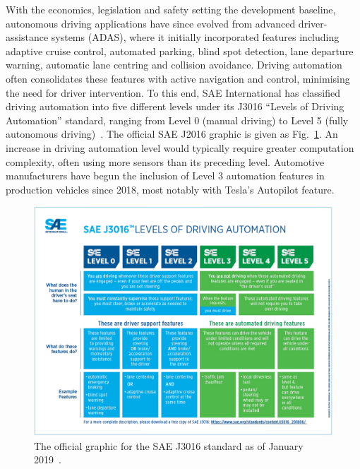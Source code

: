 With the economics, legislation and safety setting the development baseline, autonomous driving applications have since evolved from advanced driver-assistance systems (ADAS), where it initially incorporated features including adaptive cruise control, automated parking, blind spot detection, lane departure warning, automatic lane centring and collision avoidance. Driving automation often consolidates these features with active navigation and control, minimising the need for driver intervention. To this end, SAE International has classified driving automation into five different levels under its J3016 ``Levels of Driving Automation'' standard, ranging from Level 0 (manual driving) to Level 5 (fully autonomous driving)~\cite{on-road_automated_driving_orad_committee_taxonomy_2018}. %
The official SAE J2016 graphic is given as Fig.~\ref{fig:1:j3016}. An increase in driving automation level would typically require greater computation complexity, often using more sensors than its preceding level. Automotive manufacturers have begun the inclusion of Level 3 automation features in production vehicles since 2018, most notably with Tesla's Autopilot feature. 

\begin{figure}[H] 
	\centering    
	\includegraphics[width=\textwidth]{j3016}
	\caption[SAE J3016]{The official graphic for the SAE J3016 standard as of January 2019~\cite{shuttleworth_sae_2019}.}
	\label{fig:1:j3016}
\end{figure}

